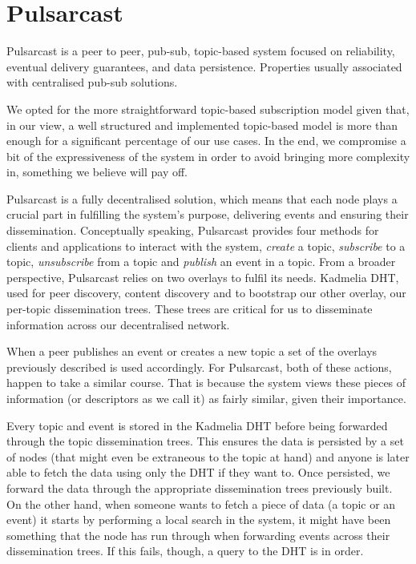 
\section{Pulsarcast}
\label{section:pulsarcast}

Pulsarcast is a peer to peer, pub-sub, topic-based system focused on
reliability, eventual delivery guarantees, and data persistence. Properties
usually associated with centralised pub-sub solutions. 

We opted for the more straightforward topic-based subscription model given
that, in our view, a well structured and implemented topic-based model is more
than enough for a significant percentage of our use cases. In the end, we
compromise a bit of the expressiveness of the system in order to avoid bringing
more complexity in, something we believe will pay off.

Pulsarcast is a fully decentralised solution, which means that each node plays
a crucial part in fulfilling the system's purpose, delivering events and
ensuring their dissemination. Conceptually speaking, Pulsarcast provides four
methods for clients and applications to interact with the system, \emph{create}
a topic, \emph{subscribe} to a topic, \emph{unsubscribe} from a topic and
\emph{publish} an event in a topic. From a broader perspective, Pulsarcast
relies on two overlays to fulfil its needs. Kadmelia DHT, used for peer
discovery, content discovery and to bootstrap our other overlay, our per-topic
dissemination trees. These trees are critical for us to disseminate information
across our decentralised network.

When a peer publishes an event or creates a new topic a set of the overlays
previously described is used accordingly. For Pulsarcast, both of these
actions, happen to take a similar course. That is because the system views
these pieces of information (or descriptors as we call it) as fairly similar,
given their importance.

Every topic and event is stored in the Kadmelia DHT before being forwarded
through the topic dissemination trees. This ensures the data is persisted by a
set of nodes (that might even be extraneous to the topic at hand) and anyone is
later able to fetch the data using only the DHT if they want to. Once
persisted, we forward the data through the appropriate dissemination trees
previously built. On the other hand, when someone wants to fetch a piece of
data (a topic or an event) it starts by performing a local search in the
system, it might have been something that the node has run through when
forwarding events across their dissemination trees. If this fails, though, a
query to the DHT is in order.

